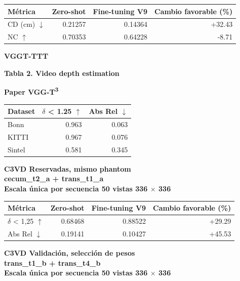 \documentclass[10pt,a4paper]{article}
\begin{document}
\begingroup\small
\begin{tabularx}{\textwidth}{@{}LRRR@{}}
\toprule
\textbf{Métrica} & \textbf{Zero-shot} & \textbf{Fine-tuning V9} & \textbf{Cambio favorable (\%)} \\
\midrule
CD (cm) \(\downarrow\) & 0.21257 & 0.14364 & +32.43 \\
NC \(\uparrow\) & 0.70353 & 0.64228 & -8.71 \\
\bottomrule
\end{tabularx}
\endgroup
\vspace{6mm}
\clearpage
{\Large\bfseries\color{header} VGGT-TTT}\par
\vspace{5mm}
{\large\bfseries Tabla 2. Video depth estimation}\par
\vspace{4mm}
{\small\bfseries Paper \textperiodcentered{} VGG-T\textsuperscript{3}}\par
\vspace{2mm}
\begingroup\small
\begin{tabularx}{\textwidth}{@{}LRR@{}}
\toprule
\textbf{Dataset} & \textbf{\(\delta\) < 1.25 \(\uparrow\)} & \textbf{Abs Rel \(\downarrow\)} \\
\midrule
Bonn & 0.963 & 0.063 \\
KITTI & 0.967 & 0.076 \\
Sintel & 0.581 & 0.345 \\
\bottomrule
\end{tabularx}
\endgroup
\vspace{6mm}
{\small\bfseries C3VD \textperiodcentered{} Reservadas, mismo phantom\\cecum\_t2\_a + trans\_t1\_a\\Escala única por secuencia \textperiodcentered{} 50 vistas \textperiodcentered{} 336 \(\times\) 336}\par
\vspace{2mm}
\begingroup\small
\begin{tabularx}{\textwidth}{@{}LRRR@{}}
\toprule
\textbf{Métrica} & \textbf{Zero-shot} & \textbf{Fine-tuning V9} & \textbf{Cambio favorable (\%)} \\
\midrule
\(\delta\) < 1,25 \(\uparrow\) & 0.68468 & 0.88522 & +29.29 \\
Abs Rel \(\downarrow\) & 0.19141 & 0.10427 & +45.53 \\
\bottomrule
\end{tabularx}
\endgroup
\vspace{6mm}
{\small\bfseries C3VD \textperiodcentered{} Validación, selección de pesos\\trans\_t1\_b + trans\_t4\_b\\Escala única por secuencia \textperiodcentered{} 50 vistas \textperiodcentered{} 336 \(\times\) 336}\par
\end{document}

